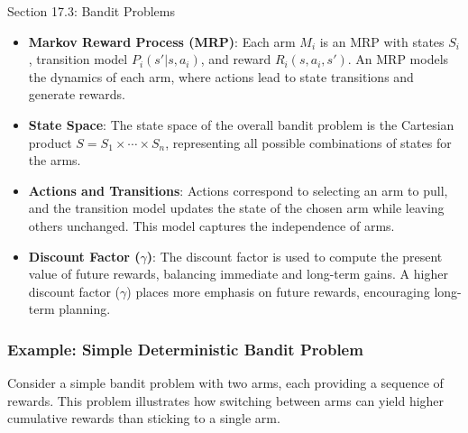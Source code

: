 \begin{notes}{Section 17.3: Bandit Problems}
\begin{highlight}
        \begin{itemize}
            \item \textbf{Markov Reward Process (MRP)}: Each arm \(M_i\) is an MRP with states \(S_i\), transition model \(P_i(s' | s, a_i)\), and reward \(R_i(s, a_i, s')\). An MRP models the dynamics 
            of each arm, where actions lead to state transitions and generate rewards.
            \item \textbf{State Space}: The state space of the overall bandit problem is the Cartesian product \(S = S_1 \times \cdots \times S_n\), representing all possible combinations of states for the arms.
            \item \textbf{Actions and Transitions}: Actions correspond to selecting an arm to pull, and the transition model updates the state of the chosen arm while leaving others unchanged. This 
            model captures the independence of arms.
            \item \textbf{Discount Factor (\(\gamma\))}: The discount factor is used to compute the present value of future rewards, balancing immediate and long-term gains. A higher discount factor 
            (\(\gamma\)) places more emphasis on future rewards, encouraging long-term planning.
        \end{itemize}
    
    \end{highlight}
    
    \subsubsection*{Example: Simple Deterministic Bandit Problem}
    
    Consider a simple bandit problem with two arms, each providing a sequence of rewards. This problem illustrates how switching between arms can yield higher cumulative rewards than sticking to a single arm.
    
    \begin{highlight}
    

\end{highlight}
\end{notes}
